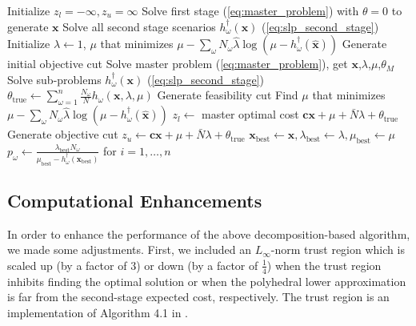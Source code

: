 \documentclass[11pt]{article}
\newcommand{\x}{\mathbf{x}}
\newcommand{\xh}{\hat{\x}}
\newcommand{\lh}{\hat{\lambda}}
\renewcommand{\c}{\mathbf{c}}
\begin{document}
	\begin{algorithmic}
		\State Initialize $z_l = -\infty, z_u = \infty$
		\State Solve first stage (\ref{eq:master_problem}) with $\theta = 0$  to generate $\x$
		\State Solve all second stage scenarios $h^\dagger_\omega(\x)$ (\ref{eq:slp_second_stage})
		\State Initialize $\lambda \gets 1$, $\mu$ that minimizes $\mu - \sum_\omega N_\omega \lh \log(\mu - h^\dagger_\omega(\xh))$
		\State Generate initial objective cut
			\State Solve master problem (\ref{eq:master_problem}), get $\x$,$\lambda$,$\mu$,$\theta_M$
			\State Solve sub-problems $h^\dagger_\omega(\x)$ (\ref{eq:slp_second_stage})
			\State $\theta_{\text{true}} \gets \sum_{\omega=1}^n \frac{N_\omega}{N} h_\omega(\x,\lambda,\mu)$
			\If{$\mu < \max_\omega h^\dagger_\omega(\x)$}
				\State Generate feasibility cut
				\State Find $\mu$ that minimizes $\mu - \sum_\omega N_\omega \lh \log(\mu - h^\dagger_\omega(\xh))$
			\Else
				\State $z_l \gets$ master optimal cost $\c\x + \mu + \bar{N}\lambda + \theta_{\text{true}}$
			\EndIf
			\State Generate objective cut
			\If{$\c\x + \mu + \bar{N}\lambda + \theta_{\text{true}} < z_u$}
				\State $z_u \gets \c\x + \mu + \bar{N}\lambda + \theta_{\text{true}}$
				\State $\x_\text{best} \gets \x, \lambda_\text{best} \gets \lambda, \mu_\text{best} \gets \mu$
				\State $p_\omega \gets \frac{\lambda_\text{best} N_\omega}{\mu_\text{best} - h^\dagger_\omega(\x_\text{best})}$ for $i = 1, \dots, n$
			\EndIf
		\EndWhile
	\end{algorithmic}

\subsection{Computational Enhancements}

In order to enhance the performance of the above decomposition-based algorithm, we made some adjustments.
First, we included an $L_\infty$-norm trust region which is scaled up (by a factor of $3$) or down (by a factor of $\tfrac{1}{4}$) when the trust region inhibits finding the optimal solution or when the polyhedral lower approximation is far from the second-stage expected cost, respectively.
The trust region is an implementation of Algorithm 4.1 in \cite{nocedal1999numerical}.
\end{document}
